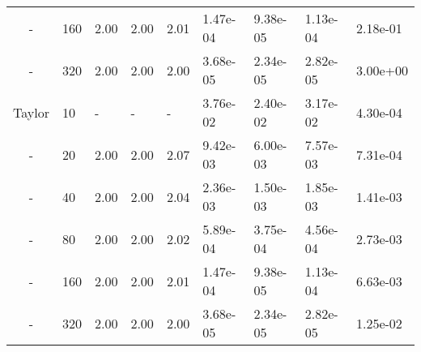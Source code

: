 \begin{table}[p]
{\begin{tabular}{cllllllll}
   - & 160 & 2.00 & 2.00 & 2.01 & 1.47e-04 & 9.38e-05 & 1.13e-04 & 2.18e-01 \\ 
   - & 320 & 2.00 & 2.00 & 2.00 & 3.68e-05 & 2.34e-05 & 2.82e-05 & 3.00e+00 \\ 
   \hline
   Taylor  &  10 & - & - & - & 3.76e-02 & 2.40e-02 & 3.17e-02 & 4.30e-04 \\ 
   -  &  20 & 2.00 & 2.00 & 2.07 & 9.42e-03 & 6.00e-03 & 7.57e-03 & 7.31e-04 \\ 
   -  &  40 & 2.00 & 2.00 & 2.04 & 2.36e-03 & 1.50e-03 & 1.85e-03 & 1.41e-03 \\ 
   -  &  80 & 2.00 & 2.00 & 2.02 & 5.89e-04 & 3.75e-04 & 4.56e-04 & 2.73e-03 \\ 
   -  & 160 & 2.00 & 2.00 & 2.01 & 1.47e-04 & 9.38e-05 & 1.13e-04 & 6.63e-03 \\ 
   -  & 320 & 2.00 & 2.00 & 2.00 & 3.68e-05 & 2.34e-05 & 2.82e-05 & 1.25e-02 \\ 
   \hline
   \end{tabular}
   }
\end{table}

\clearpage

